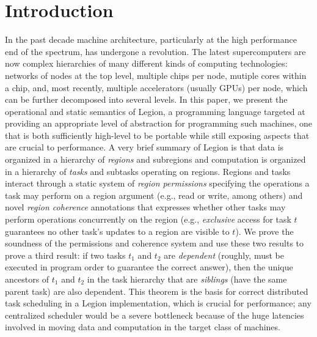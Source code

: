 
\section{Introduction}
\label{sec:intro}

In the past decade machine architecture, particularly at the high
performance end of the spectrum, has undergone a revolution.  The
latest supercomputers are now complex hierarchies of many different
kinds of computing technologies: networks of nodes at the top level,
multiple chips per node, mutiple cores within a chip, and, most
recently, multiple accelerators (usually GPUs) per node, which 
can be further decomposed into several levels.   In this paper, we present the operational and static
semantics of Legion, a programming language targeted at providing an
appropriate level of abstraction for programming such machines, one
that is both sufficiently high-level to be portable while still
exposing aspects that are crucial to performance. A very brief summary
of Legion is that data is organized in a hierarchy of {\em regions}
and subregions and computation is organized in a hierarchy of {\em
tasks} and subtasks operating on regions.  Regions and tasks interact
through a static system of {\em region permissions} specifying the
operations a task may perform on a region argument (e.g., read or
write, among others) and novel {\em region coherence} annotations that
expresses whether other tasks may perform operations concurrently on
the region (e.g., {\em exclusive} access for task $t$ guarantees no
other task's updates to a region are visible to $t$).  We prove the
soundness of the permissions and coherence system and use these two
results to prove a third result: if two tasks $t_1$ and $t_2$ are {\em
dependent} (roughly, must be executed in program order to guarantee
the correct answer), then the unique ancestors of $t_1$ and $t_2$ in
the task hierarchy that are {\em siblings} (have the same parent task)
are also dependent.  This theorem is the basis for correct distributed
task scheduling in a Legion implementation, which is crucial for
performance; any centralized scheduler would be a severe bottleneck
because of the huge latencies involved in moving data and computation
in the target class of machines.


